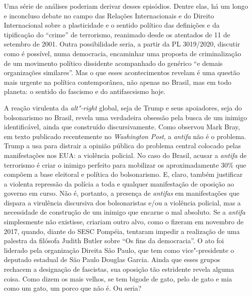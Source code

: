 Uma série de análises poderiam derivar desses episódios. Dentre elas, há
um longo e inconcluso debate no campo das Relações Internacionais e do
Direito Internacional sobre a plasticidade e o sentido político das
definições e da tipificação do ``crime'' de terrorismo, reanimado desde
os atentados de 11 de setembro de 2001. Outra possibilidade seria, a
partir da PL 3019/2020, discutir como é possível, numa democracia,
encaminhar uma proposta de criminalização de um movimento político
dissidente acompanhado do genérico ``e demais organizações similares''.
Mas o que esses acontecimentos revelam é uma questão mais urgente na
política contemporânea, não apenas no Brasil, mas em todo planeta: o
sentido do fascismo e do antifascsismo hoje.

A reação virulenta da \emph{alt"-right} global, seja de Trump e seus
apoiadores, seja do bolsonarismo no Brasil, revela uma verdadeira
obsessão pela busca de um inimigo identificável, ainda que construído
discursivamente. Como observou Mark Bray, em texto publicado
recentemente no \emph{Washington Post}, a \emph{antifa} não é o
problema. Trump a usa para distrair a opinião pública do problema
central colocado pelas manifestações nos EUA: a violência policial. No
caso do Brasil, acusar a \emph{antifa} de terrorismo é criar o inimigo
perfeito para mobilizar os aproximadamente 30\% que compõem a base
eleitoral e política do bolsonarismo. E, claro, também justificar a
violenta repressão da polícia a toda e qualquer manifestação de oposição
ao governo em curso. Não é, portanto, a presença de \emph{antifas} em
manifestações que dispara a virulência discursiva dos bolsonaristas e/ou
a violência policial, mas a necessidade de construção de um inimigo que
encarne o mal absoluto. Se a \emph{antifa} simplesmente não existisse,
criariam outro alvo, como o fizeram em novembro de 2017, quando, diante
do SESC Pompéia, tentaram impedir a realização de uma palestra da
filósofa Judith Butler sobre ``Os fins da democracia''. O ato foi
liderado pela organização Direita São Paulo, que tem como
vice"-presidente o deputado estadual de São Paulo Douglas Garcia. Ainda
que esses grupos rechacem a designação de fascistas, sua oposição tão
estridente revela alguma coisa. Como dizem os mais velhos, se tem bigode
de gato, pelo de gato e mia como um gato, um porco que não é. Ou seria?

